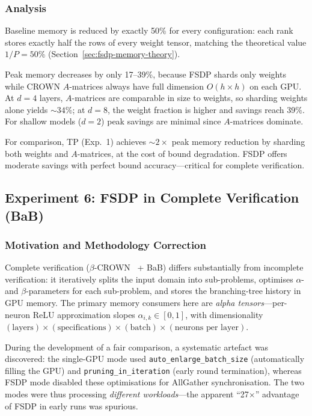 \subsubsection{Analysis}

Baseline memory is reduced by exactly 50\% for every configuration: each rank
stores exactly half the rows of every weight tensor, matching the theoretical
value $1/P = 50\%$ (Section~\ref{sec:fsdp-memory-theory}).

Peak memory decreases by only 17--39\%, because FSDP shards only weights while
CROWN $A$-matrices always have full dimension $O(h \times h)$ on each GPU.
At $d = 4$ layers, $A$-matrices are comparable in size to weights, so sharding
weights alone yields ${\sim}34\%$; at $d = 8$, the weight fraction is higher
and savings reach 39\%. For shallow models ($d = 2$) peak savings are minimal
since $A$-matrices dominate.

For comparison, TP (Exp.~1) achieves ${\sim}2\times$ peak memory reduction by
sharding both weights and $A$-matrices, at the cost of bound degradation.
FSDP offers moderate savings with perfect bound accuracy---critical for complete
verification.

\subsection{Experiment 6: FSDP in Complete Verification (BaB)}
\label{sec:exp6}

\subsubsection{Motivation and Methodology Correction}

Complete verification ($\beta$-CROWN~\cite{betaCROWN2021} + BaB) differs
substantially from incomplete verification: it iteratively splits the input
domain into sub-problems, optimises $\alpha$- and $\beta$-parameters for each
sub-problem, and stores the branching-tree history in GPU memory. The primary
memory consumers here are \textit{alpha tensors}---per-neuron ReLU approximation
slopes $\alpha_{i,k} \in [0, 1]$, with dimensionality
$(\text{layers}) \times (\text{specifications}) \times (\text{batch}) \times
(\text{neurons per layer})$.

During the development of a fair comparison, a systematic artefact was discovered:
the single-GPU mode used \texttt{auto\_enlarge\_batch\_size} (automatically
filling the GPU) and \texttt{pruning\_in\_iteration} (early round termination),
whereas FSDP mode disabled these optimisations for AllGather synchronisation.
The two modes were thus processing \textit{different workloads}---the apparent
``27$\times$'' advantage of FSDP in early runs was spurious.

